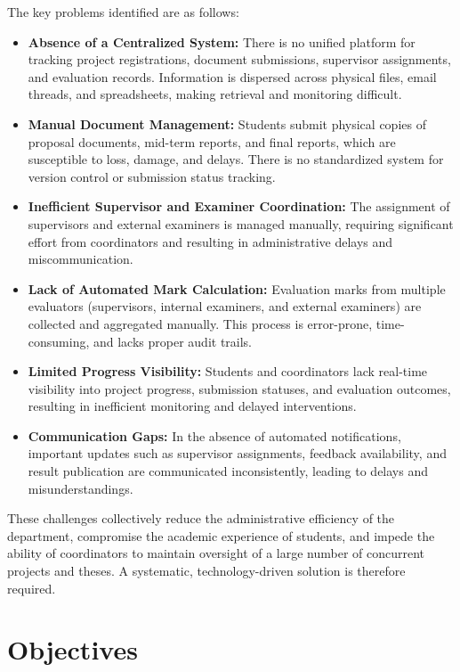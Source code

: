 The key problems identified are as follows:
\begin{itemize}
  \item \textbf{Absence of a Centralized System:} There is no unified platform for tracking project registrations, document submissions, supervisor assignments, and evaluation records. Information is dispersed across physical files, email threads, and spreadsheets, making retrieval and monitoring difficult.
  
  \item \textbf{Manual Document Management:} Students submit physical copies of proposal documents, mid-term reports, and final reports, which are susceptible to loss, damage, and delays. There is no standardized system for version control or submission status tracking.
  
  \item \textbf{Inefficient Supervisor and Examiner Coordination:} The assignment of supervisors and external examiners is managed manually, requiring significant effort from coordinators and resulting in administrative delays and miscommunication.
  
  \item \textbf{Lack of Automated Mark Calculation:} Evaluation marks from multiple evaluators (supervisors, internal examiners, and external examiners) are collected and aggregated manually. This process is error-prone, time-consuming, and lacks proper audit trails.
  
  \item \textbf{Limited Progress Visibility:} Students and coordinators lack real-time visibility into project progress, submission statuses, and evaluation outcomes, resulting in inefficient monitoring and delayed interventions.
  
  \item \textbf{Communication Gaps:} In the absence of automated notifications, important updates such as supervisor assignments, feedback availability, and result publication are communicated inconsistently, leading to delays and misunderstandings.
\end{itemize}

These challenges collectively reduce the administrative efficiency of the department, compromise the academic experience of students, and impede the ability of coordinators to maintain oversight of a large number of concurrent projects and theses. A systematic, technology-driven solution is therefore required.

\section{Objectives}

